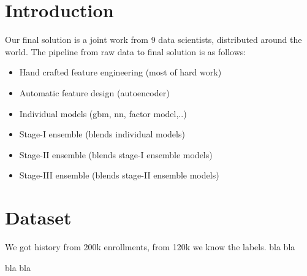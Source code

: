 \section{Introduction}
Our final solution is a joint work from 9 data scientists, distributed around the world.
The pipeline from raw data to final solution is as follows:
\begin{itemize}
  \setlength\itemsep{0em}
  \item Hand crafted feature engineering (most of hard work)
  \item Automatic feature design (autoencoder)
  \item Individual models (gbm, nn, factor model,..)
  \item Stage-I ensemble (blends individual models)
  \item Stage-II ensemble (blends stage-I ensemble models)
  \item Stage-III ensemble (blends stage-II ensemble models)
\end{itemize}


\section{Dataset}
We got history from 200k enrollments, from 120k we know the labels.
bla bla

bla bla